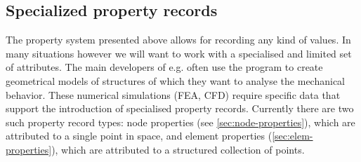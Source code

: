 \subsection{Specialized property records}
\label{sec:special-properties}

The property system presented above allows for recording any kind of values. In many situations however we will want to work with a specialised and limited set of attributes. The main developers of \pyf e.g. often use the program to create geometrical models of structures of which they want to analyse the mechanical behavior. These numerical simulations (FEA, CFD) require specific data that support the introduction of specialised property records. Currently there are two such property record types: node properties (see \ref{sec:node-properties}), which are attributed to a single point in space, and element properties (\ref{sec:elem-properties}), which are attributed to a structured collection of points.

